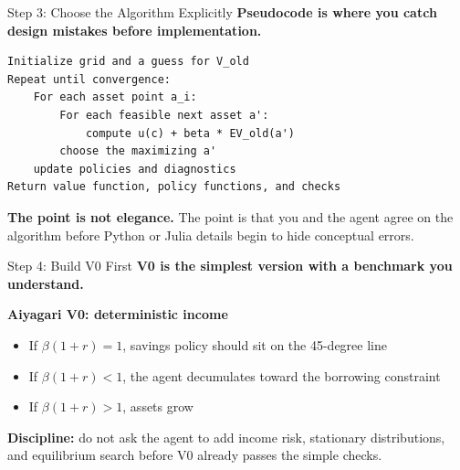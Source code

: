 \documentclass[10pt,english,aspectratio=169]{beamer}
\begin{document}
\begin{frame}[fragile]{Step 3: Choose the Algorithm Explicitly}
\textbf{Pseudocode is where you catch design mistakes before implementation.}

\vspace{0.2cm}

\begin{lstlisting}[style=pythonstyle,language={},basicstyle=\ttfamily\tiny,numbers=none]
Initialize grid and a guess for V_old
Repeat until convergence:
    For each asset point a_i:
        For each feasible next asset a':
            compute u(c) + beta * EV_old(a')
        choose the maximizing a'
    update policies and diagnostics
Return value function, policy functions, and checks
\end{lstlisting}

\vspace{0.15cm}

\textbf{The point is not elegance.} The point is that you and the agent agree on the algorithm before Python or Julia details begin to hide conceptual errors.
\end{frame}

\begin{frame}{Step 4: Build V0 First}
\textbf{V0 is the simplest version with a benchmark you understand.}

\vspace{0.25cm}

\textbf{Aiyagari V0: deterministic income}
\begin{itemize}
    \item If $\beta(1+r)=1$, savings policy should sit on the 45-degree line
    \item If $\beta(1+r)<1$, the agent decumulates toward the borrowing constraint
    \item If $\beta(1+r)>1$, assets grow
\end{itemize}

\vspace{0.25cm}

\textbf{Discipline:} do not ask the agent to add income risk, stationary distributions, and equilibrium search before V0 already passes the simple checks.
\end{frame}
\end{document}
